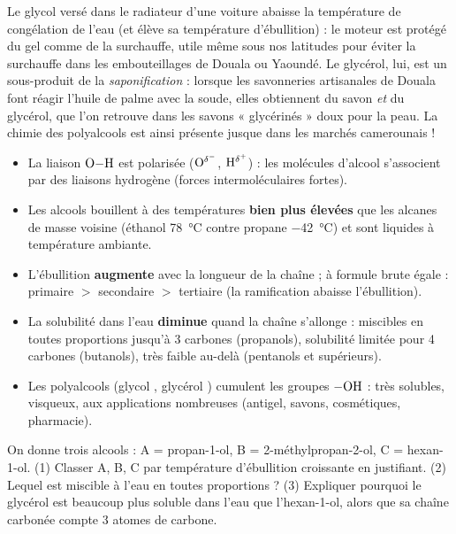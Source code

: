 \documentclass[11pt]{article}
\newcommand{\cle}[1]{{\popxbold\color{popdark}#1}}
\begin{document}
\begin{savaistu}
Le glycol versé dans le radiateur d'une voiture abaisse la température de congélation de l'eau (et élève sa température d'ébullition) : le moteur est protégé du gel comme de la surchauffe, utile même sous nos latitudes pour éviter la surchauffe dans les embouteillages de Douala ou Yaoundé. Le glycérol, lui, est un sous-produit de la \emph{saponification} : lorsque les savonneries artisanales de Douala font réagir l'huile de palme avec la soude, elles obtiennent du savon \emph{et} du glycérol, que l'on retrouve dans les savons « glycérinés » doux pour la peau. La chimie des polyalcools est ainsi présente jusque dans les marchés camerounais !
\end{savaistu}

\begin{aretenir}
\begin{itemize}
\item La liaison $\ce{O-H}$ est polarisée ($\ce{O}^{\delta^-}$, $\ce{H}^{\delta^+}$) : les molécules d'alcool s'associent par des \cle{liaisons hydrogène} (forces intermoléculaires fortes).
\item Les alcools bouillent à des températures \textbf{bien plus élevées} que les alcanes de masse voisine (éthanol \SI{78}{\celsius} contre propane \SI{-42}{\celsius}) et sont liquides à température ambiante.
\item L'ébullition \textbf{augmente} avec la longueur de la chaîne ; à formule brute égale : primaire $>$ secondaire $>$ tertiaire (la ramification abaisse l'ébullition).
\item La solubilité dans l'eau \textbf{diminue} quand la chaîne s'allonge : miscibles en toutes proportions jusqu'à 3 carbones (propanols), solubilité limitée pour 4 carbones (butanols), très faible au-delà (pentanols et supérieurs).
\item Les polyalcools (glycol , glycérol ) cumulent les groupes $-\ce{OH}$ : très solubles, visqueux, aux applications nombreuses (antigel, savons, cosmétiques, pharmacie).
\end{itemize}
\end{aretenir}

\begin{exercice}
On donne trois alcools : A = propan-1-ol, B = 2-méthylpropan-2-ol, C = hexan-1-ol. (1) Classer A, B, C par température d'ébullition croissante en justifiant. (2) Lequel est miscible à l'eau en toutes proportions ? (3) Expliquer pourquoi le glycérol est beaucoup plus soluble dans l'eau que l'hexan-1-ol, alors que sa chaîne carbonée compte 3 atomes de carbone.
\end{exercice}
\end{document}
